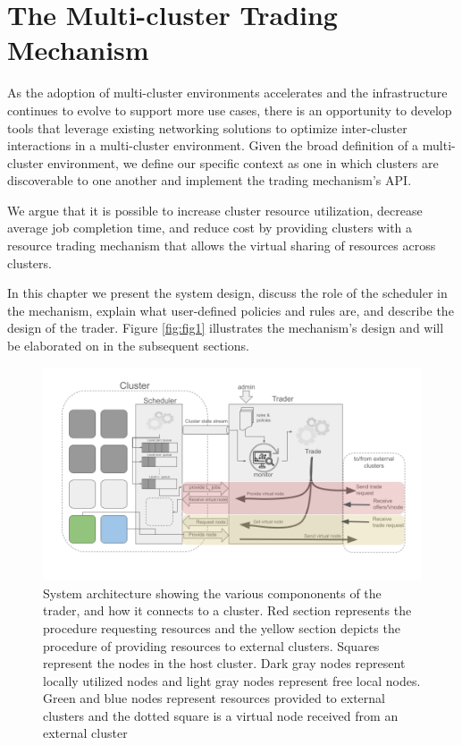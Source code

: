 
\chapter{The Multi-cluster Trading Mechanism}

As the adoption of multi-cluster environments accelerates and the
infrastructure continues to evolve to support more use cases, there is an
opportunity to develop tools that leverage existing networking solutions to
optimize inter-cluster interactions in a multi-cluster environment. Given the
broad definition of a multi-cluster environment, we define our specific context
as one in which clusters are discoverable to one another and implement the
trading mechanism's API.

We argue that it is possible to increase cluster resource utilization, decrease
average job completion time, and reduce cost by providing clusters with a
resource trading mechanism that allows the virtual sharing of resources across
clusters. 

In this chapter we present the system design, discuss the role of the scheduler
in the mechanism, explain what user-defined policies and rules are, and
describe the design of the trader. Figure \ref{fig:fig1} illustrates the
mechanism's design and will be elaborated on in the subsequent sections.

\begin{figure}[H]
  \centerline{\includegraphics[scale=0.45]{figures/system-diagram}}
  \caption[System architecture]{System architecture showing the various compononents of the trader,
    and how it connects to a cluster. Red section represents the procedure
    requesting resources and the yellow section depicts the procedure of
    providing resources to external clusters. Squares represent the nodes in
    the host cluster. Dark gray nodes represent locally utilized nodes and light
    gray nodes represent free local nodes. Green and blue nodes represent
    resources    provided to external clusters and the dotted square is a
    virtual node received from an external cluster} 
\end{figure}

